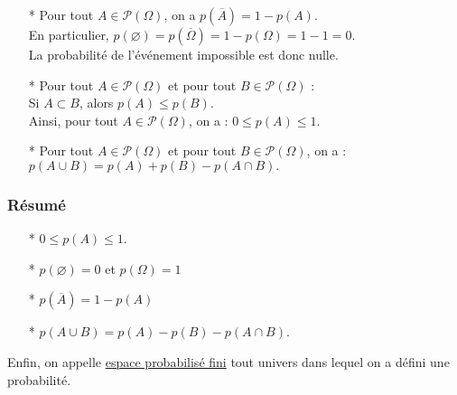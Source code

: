 \begin{itemize}
\item[*] Pour tout $A \in \mathcal{P}\left (\Omega\right )$, on a $p\left(\overline{A}\right) = 1 - p\left(A\right)$. \\ En particulier, $p\left(\varnothing\right) = p\left(\overline{\Omega}\right) = 1 - p\left(\Omega\right) = 1 - 1 = 0$. \\ La probabilité de l'événement impossible est donc nulle. \\

\item[*] Pour tout $A \in \mathcal{P}\left (\Omega\right )$ et pour tout $B\in \mathcal{P}\left (\Omega\right )$ : \\ Si $A \subset B$, alors $p\left(A\right) \leqslant p\left(B\right)$. \\ Ainsi, pour tout $A \in \mathcal{P}\left (\Omega\right )$, on a : $0 \leqslant p\left(A\right) \leqslant 1$. \\

\item[*] Pour tout $A\in \mathcal{P}\left (\Omega\right )$ et pour tout $B \in \mathcal{P}\left (\Omega\right )$, on a : $p\left(A\cup B\right) = p\left(A\right) + p\left(B\right) - p\left(A\cap B\right).$ 
\end{itemize}

\subsubsection{Résumé}

\begin{itemize}
\item[*]$0 \leqslant p\left(A\right) \leqslant 1$. \\
\item[*] $p\left( \varnothing\right) = 0 $ et $ p\left(\Omega\right) = 1$ \\
\item[*] $p\left(\overline{A}\right) = 1 - p\left(A\right) $ \\
\item[*] $p\left( A \cup B \right) = p \left(A \right) - p \left(B \right) - p\left(A \cap B\right) $. \\
\end{itemize}

\vspace*{.3cm}

Enfin, on appelle \underline{espace probabilisé fini} tout univers dans lequel on a défini une probabilité.

